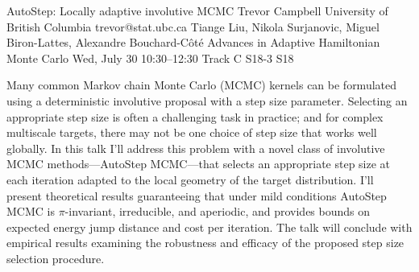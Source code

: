 \begin{talk}
  {AutoStep: Locally adaptive involutive MCMC}%
  {Trevor Campbell}%
  {University of British Columbia}%
  {trevor@stat.ubc.ca}%
  {Tiange Liu, Nikola Surjanovic, Miguel Biron-Lattes, Alexandre Bouchard-C\^ot\'e}%
  {Advances in Adaptive Hamiltonian Monte Carlo}%
  {Wed, July 30 10:30–12:30 Track C}%
  {S18-3}%
  {S18}%
				

\medskip

Many common Markov chain Monte Carlo (MCMC) kernels can be formulated using a deterministic involutive proposal with a step size parameter.  Selecting an appropriate step size is often a challenging task in practice; and for complex multiscale targets, there may not be one choice of step size that works well globally.  In this talk I'll address this problem with a novel class of involutive MCMC methods---AutoStep MCMC---that selects an appropriate step size at each iteration adapted to the local geometry of the target distribution.  I'll present theoretical results guaranteeing that under mild conditions AutoStep MCMC is $\pi$-invariant, irreducible, and aperiodic, and provides bounds on expected energy jump distance and cost per iteration. The talk will conclude with empirical results examining the robustness and efficacy of the proposed step size selection procedure.

\end{talk}

